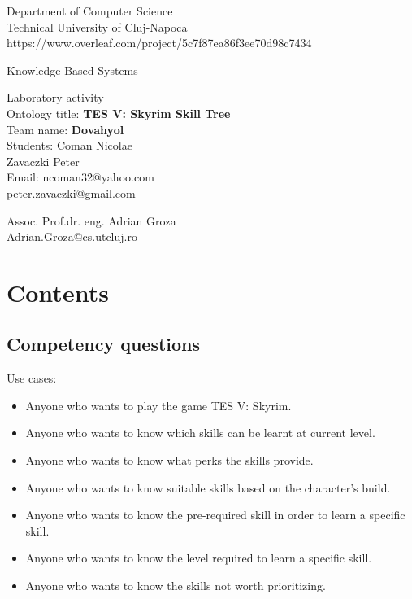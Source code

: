 \documentclass[a4paper,12pt]{report}
\begin{document}
\newcommand{\h}{\texttt}

\vspace{-5cm}
\begin{center}
Department of Computer Science\\
Technical University of Cluj-Napoca\\https://www.overleaf.com/project/5c7f87ea86f3ee70d98c7434
\end{center}
\vspace{1cm}
\begin{center}
\begin{Large}
Knowledge-Based Systems\\
\end{Large}
Laboratory activity\\


Ontology title: \textbf{TES V: Skyrim Skill Tree}\\
Team name: \textbf{Dovahyol}\\
Students: Coman Nicolae\\
Zavaczki Peter\\
Email: ncoman32@yahoo.com\\
peter.zavaczki@gmail.com\\

\vspace*{14cm}

Assoc. Prof.dr. eng. Adrian Groza\\
Adrian.Groza@cs.utcluj.ro
\end{center}

\newpage

\tableofcontents
\clearpage
\chapter{Contents}
\section{Competency questions}
Use cases:

\begin{itemize}
\item Anyone who wants to play the game TES V: Skyrim.
\item Anyone who wants to know which skills can be learnt at current level.
\item Anyone who wants to know what perks the skills provide.
\item Anyone who wants to know suitable skills based on the character's build.
\item Anyone who wants to know the pre-required skill in order to learn a specific skill.
\item Anyone who wants to know the level required to learn a specific skill.
\item Anyone who wants to know the skills not worth prioritizing.
\end{itemize}
\end{document}
